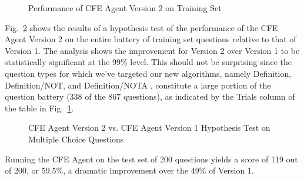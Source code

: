\begin{figure}
\centering
\vspace{0.25in}
\caption{Performance of CFE Agent Version 2 on Training Set}
\label{fig:version_2_training_set_performance}
\end{figure}

Fig.~\ref{fig:version_2_multiple_choice_hypothesis_test} shows the results of a hypothesis test of the performance of the CFE Agent Version 2 on the entire battery of training set questions relative to that of Version 1.  The analysis shows the improvement for Version 2 over Version 1 to be statistically significant at the 99\% level.  This should not be surprising since the question types for which we've targeted our new algorithms, namely Definition, Definition/NOT, and Definition/NOTA , constitute a large portion of the question battery (338 of the 867 questions), as indicated by the Trials column of the table in Fig.~\ref{fig:version_2_training_set_performance}.

\begin{figure}
\centering
\vspace{0.75in}
\caption{CFE Agent Version 2 vs. CFE Agent Version 1 Hypothesis Test on Multiple Choice Questions}
\label{fig:version_2_multiple_choice_hypothesis_test}
\end{figure}

Running the CFE Agent on the test set of 200 questions yields a score of 119 out of 200, or 59.5\%, a dramatic improvement over the 49\% of Version 1.

















